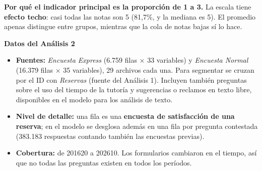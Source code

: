 \documentclass[11pt,letterpaper]{article}
\begin{document}
\textbf{Por qué el indicador principal es la proporción de 1 a 3.} La escala tiene \textbf{efecto techo}: casi todas las notas son 5 (81,7\%, y la mediana es 5). El promedio apenas distingue entre grupos, mientras que la cola de notas bajas sí lo hace.

\textbf{Datos del Análisis 2}

\begin{itemize}[leftmargin=1.5em,itemsep=2pt]
\item \textbf{Fuentes:} \emph{Encuesta Express} (6.759 filas $\times$ 33 variables) y \emph{Encuesta Normal} (16.379 filas $\times$ 35 variables), 29 archivos cada una. Para segmentar se cruzan por el ID con \emph{Reservas} (fuente del Análisis 1). Incluyen también preguntas sobre el uso del tiempo de la tutoría y sugerencias o reclamos en texto libre, disponibles en el modelo para los análisis de texto.
\item \textbf{Nivel de detalle:} una fila es una \textbf{encuesta de satisfacción de una reserva}; en el modelo se desglosa además en una fila por pregunta contestada (383.183 respuestas contando también las encuestas previas).
\item \textbf{Cobertura:} de 201620 a 202610. Los formularios cambiaron en el tiempo, así que no todas las preguntas existen en todos los períodos.
\end{itemize}
\end{document}
